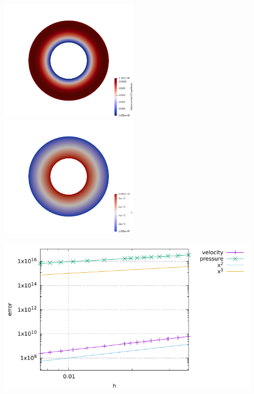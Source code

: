 \begin{center}
\includegraphics[width=7cm]{python_codes/fieldstone_36/disp}
\includegraphics[width=7cm]{python_codes/fieldstone_36/p}
\end{center}

\begin{center}
\includegraphics[width=14cm]{python_codes/fieldstone_36/errors}
\end{center}




